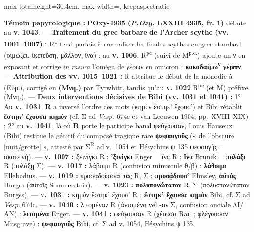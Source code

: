 \documentclass[11pt,twoside]{book}
\newcommand{\currHeadLE}{ΑΡΙΣΤΟΦΑΝΟΥΣ ΘΕΣΜΟΦΟΡΙΑΖΟΥΣΑΙ · SCHOLIES ({\policeGr Σ}\expo{R}) \& GLOSES DU CODEX RAVENNAS 429}
\newcommand{\currHeadRE}{Atlas \& Édition Folio par Folio (ff. 162v–177r)}
\newcommand{\currHeadLO}{ATLAS DES SCHOLIES ({\policeGr Σ}\expo{R}), GLOSES INTERLINÉAIRES \& COLLATION DE R}
\newcommand{\italique}[1]{\textit{#1}}
\newcommand{\auDessus}[2]{\leavevmode\vbox{\offinterlineskip\ialign{\hfil##\hfil\cr\fontsize{5.5pt}{6pt}\selectfont #2\cr\noalign{\kern0.1ex}#1\cr}}}
\newcommand{\inRas}[2]{\if\relax\detokenize{#2}\relax\sout{#1}\else\auDessus{\sout{#1}}{#2}\fi}
\newcommand{\expo}[1]{\textsuperscript{#1}}
\newcommand{\R}{\textbf{R}}
\newcommand{\Run}{R\expo{1}}
\newcommand{\Rpc}{R\expo{pc}}
\newcommand{\Mon}{M}
\newcommand{\PsiQuatre}{POxy-4935}
\newcommand{\lecon}[1]{\textbf{#1}}
\newcommand{\espApp}{\ {\color{ruleGold}{\policeFr ∥}}\ }
\begin{document}
\begin{adjustbox}{max totalheight=30.4cm, max width=\textwidth, keepaspectratio}
\begin{minipage}{\textwidth}
{ \textbf{Témoin papyrologique :} \textbf{\PsiQuatre{} (\italique{P.Oxy.} LXXIII 4935, fr. 1)} débute au \textbf{v. 1043}. --- \textbf{Traitement du grec barbare de l'Archer scythe (vv. 1001–1007) :} \Run{} tend parfois à normaliser les finales scythes en grec standard (οἰμώξει, ἱκετεῦση, μᾶλλον, ἵνα) ; au \textbf{v. 1006}, \Rpc{} (suivi de \Mon\expo{p.c.}) ajoute un ν en exposant et corrige \italique{in rasura} l'oméga de γέρων en omicron : \lecon{κακοδαίμω\expo{ν} γέρ\inRas{ω}{ο}ν}. --- \textbf{Attribution des vv. 1015–1021 :} R attribue le début de la monodie à (Εὐρ.), corrigé en \lecon{(Μνη.)} par Tyrwhitt, tandis qu'au \textbf{v. 1022} \Rpc{} (et \Mon{}) préfixe (Μνη.). --- \textbf{Deux interventions décisives de Bibi (vv. 1031 et 1041) :} 1° Au \textbf{v.~1031}, \R{} a inversé l'ordre des mots (κημὸν ἕστηκ' ἔχουσ') et Bibi rétablit \lecon{ἕστηκ' ἔχουσα κημόν} (cf. {\policeGr Σ} ad \italique{Vesp.} 674c et van Leeuwen 1904, pp.~XVIII–XIX) ; 2° au \textbf{v.~1041}, là où \R{} porte le participe banal φεύγουσαν, Louis Hauseux (Bibi) restitue le génitif du composé tragique rare \lecon{ψεφαυγοῦς} (« de l'obscure [nuit/grotte] », attesté par {\policeGr Σ}\expo{R} ad v.~1054 et Hésychius ψ 135 ψεφαυγής· σκοτεινή). --- \textbf{v. 1007 :} ξεινίγκι R : \lecon{'ξινίγκι} Enger \espApp ἵνα R : \lecon{ἴνα} Brunck \espApp \lecon{πυλάξι} R (πυλάξῃ {\policeGr Σ}). --- \textbf{v. 1017 :} λάβοιμι R (confusion minuscule θ/β) : \lecon{λάθοιμι} Ellebodius. --- \textbf{v. 1019 :} προσᾳδοῦσσαι τὰς R, {\policeGr Σ} : \lecon{προσᾴδουσ'} Elmsley, \lecon{ἀϋτὰς} Burges (ἀϋταῖς Sommerstein). --- \textbf{v. 1023 :} \lecon{πολυπονώτατον} R, {\policeGr Σ} (πολυστονώτατον Burges). --- \textbf{v. 1031 :} κημὸν ἕστηκ' ἔχουσ' R : \lecon{ἕστηκ' ἔχουσα κημόν} Bibi, cf. {\policeGr Σ} ad \italique{Vesp.} 674c. --- \textbf{v. 1040 :} λιτομέναν R (ἀντομένα vel -αν {\policeGr Σ}, confusion onciale ΛΙ/ΑΝ) : \lecon{λιτομένα} Enger. --- \textbf{v. 1041 :} φεύγουσαν R (χέουσα Rau ; φλέγουσαν Musgrave) : \lecon{ψεφαυγοῦς} Bibi, cf. {\policeGr Σ} ad v. 1054, Hésychius ψ 135.\par}
\end{minipage}\end{adjustbox}
\newpage
\renewcommand{\currHeadLE}{SCHOLIES MARGINALES ({\policeGr Σ}\expo{R}) \& GLOSES INTERLINÉAIRES · FOLIO 25/30}
\renewcommand{\currHeadRE}{f. 174v (Classense 176v) · vv. 1001–1043 · {\policeGr Σ} 311 à {\policeGr Σ} 328}
\renewcommand{\currHeadLO}{SCHOLIES MARGINALES ({\policeGr Σ}\expo{R}) \& GLOSES INTERLINÉAIRES · FOLIO 25/30}
\end{document}

